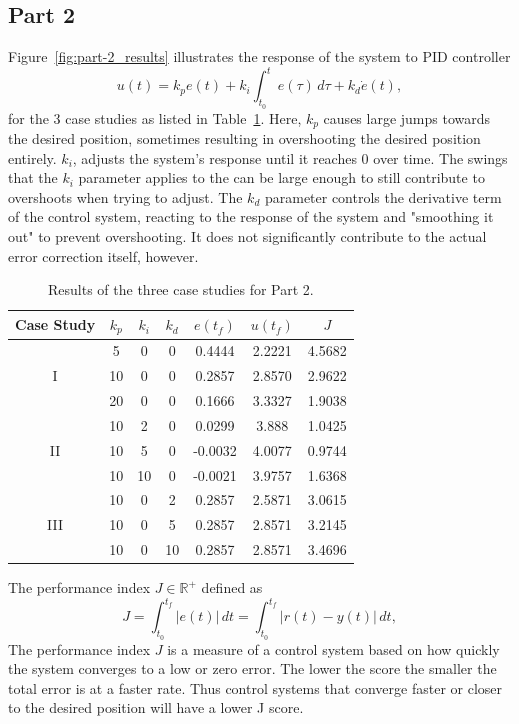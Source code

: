 \documentclass{article}
\begin{document}
\subsection*{Part 2}
Figure~\ref{fig:part-2_results} illustrates the response of the system to PID controller
\begin{equation}
    \label{eq:pid}
    u(t) = k_p e(t) + k_i \int_{t_0}^t e(\tau)\,d\tau + k_d\dot{e}(t), 
\end{equation}
for the 3 case studies as listed in Table~\ref{tab:part-2}. Here, $k_p$ causes large jumps towards the desired position, sometimes resulting in overshooting the desired position entirely. $k_i$, adjusts the system's response until it reaches 0 over time. The swings that the $k_i$ parameter applies to the can be large enough to still contribute to overshoots when trying to adjust. The $k_d$ parameter controls the derivative term of the control system, reacting to the response of the system and "smoothing it out" to prevent overshooting. It does not significantly contribute to the actual error correction itself, however.
%
\begin{table}[H]
    \centering
    \begin{tabular}{|c|c|c|c||c|c|c|}
        \hline
         Case Study & $k_p$ & $k_i$ & $k_d$ & $e(t_f)$ & $u(t_f)$ & $J$  \\
        \hline\hline
        \multirow{3}{*}{I} &  5 & 0 & 0 & 0.4444 & 2.2221 & 4.5682\\
                           & 10 & 0 & 0 & 0.2857 & 2.8570 & 2.9622\\
                           & 20 & 0 & 0 & 0.1666 & 3.3327 & 1.9038\\
        \hline
        \multirow{3}{*}{II} & 10 &  2 & 0 & 0.0299 & 3.888 & 1.0425\\
                            & 10 &  5 & 0 & -0.0032 & 4.0077 & 0.9744\\
                            & 10 & 10 & 0 & -0.0021 & 3.9757 & 1.6368\\
        \hline
        \multirow{3}{*}{III} & 10 & 0 &  2 & 0.2857 & 2.5871 & 3.0615\\
                             & 10 & 0 &  5 & 0.2857 & 2.8571 & 3.2145\\
                             & 10 & 0 & 10 & 0.2857 & 2.8571 & 3.4696\\
        \hline
    \end{tabular}
    \caption{Results of the three case studies for Part 2.}
    \label{tab:part-2}
\end{table}
%
The performance index $J \in \mathbb{R}^+$ defined as
\begin{equation}
    J = \int_{t_0}^{t_f} |e(t)|\,dt = \int_{t_0}^{t_f} |r(t) - y(t)|\,dt,
\end{equation}
The performance index $J$ is a measure of a control system based on how quickly the system converges to a low or zero error. The lower the score the smaller the total error is at a faster rate. Thus control systems that converge faster or closer to the desired position will have a lower J score.
\end{document}
